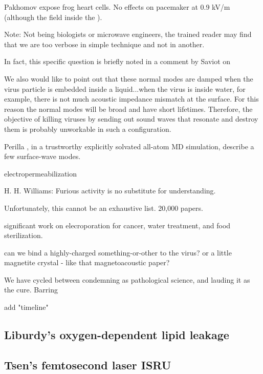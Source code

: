 \documentclass[paper.tex]{subfiles}
\begin{document}
Pakhomov \cite{Comparative} expose frog heart cells. No effects on pacemaker at 0.9 kV/m (although the field inside the ). 


Note: Not being biologists or microwave engineers, the trained reader may find that we are too verbose in simple technique and not in another. 




In fact, this specific question is briefly noted in a comment by Saviot \cite{Comment2004} on 


\begin{fquote}
	We also would like to point out that these normal modes are damped when the virus particle is embedded inside a liquid...when the virus is inside water, for example, there is not much acoustic impedance mismatch at the surface. For this reason the normal modes will be broad and have short lifetimes. Therefore, the objective of killing viruses by sending out sound waves that resonate and destroy them is probably unworkable in such a configuration.	
\end{fquote}







Perilla \cite{}, in a trustworthy explicitly solvated all-atom MD simulation, describe a few surface-wave modes.




electropermeabilization


H. H. Williams: Furious activity is no substitute for understanding.

Unfortunately, this cannot be an exhaustive list. 20,000 papers.

significant work on elecroporation for cancer, water treatment, and food sterilization.


can we bind a highly-charged something-or-other to the virus?
or a little magnetite crystal - like that magnetoacoustic paper?


We have cycled between condemning as pathological science, and lauding it as the cure. Barring 


add "timeline"



\subsection{Liburdy's oxygen-dependent lipid leakage}



\subsection{Tsen's femtosecond laser ISRU}
\end{document}
